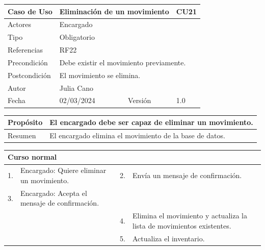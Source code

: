 \newpage


\begin{table}[H]
	\centering
	\begin{tabular}{| m{} | m{} | m{} | m{}|}
		\hline
		\rowcolor{grayshade} Caso de Uso & \multicolumn{2}{|m{0.43\textwidth}|}{Eliminación de un movimiento} &  CU21\\ 
		\hline
		Actores & \multicolumn{3}{l|}{Encargado} \\ 
		\hline
		Tipo & \multicolumn{3}{l|}{Obligatorio} \\ 
		\hline
		Referencias & \multicolumn{3}{l|}{RF22} \\ 
		\hline
		Precondición & \multicolumn{3}{m{0.67\textwidth}|}{Debe existir el movimiento previamente.} \\ 
		\hline
		Postcondición & \multicolumn{3}{m{0.67\textwidth}|}{El movimiento se elimina.} \\ 
		\hline
		Autor & \multicolumn{3}{l|}{Julia Cano} \\ 
		\hline
		Fecha & 02/03/2024 & Versión & 1.0 \\
		\hline
	\end{tabular}
\end{table}

\begin{table}[H]
	\centering
	\begin{tabular}{| m{} | m{} | m{} | m{} |}
		\hline
		Propósito & \multicolumn{3}{m{0.67\textwidth}|}{El encargado debe ser capaz de eliminar un movimiento.}  \\ 
		\hline
		Resumen & \multicolumn{3}{m{0.67\textwidth}|}{El encargado elimina el movimiento de la base de datos.} \\ 
		\hline
	\end{tabular}
\end{table}


\begin{table}[H]
	\centering
	\begin{tabular}{| m{} | m{} | m{} | m{} |}
		\hline
		\multicolumn{4}{|m{0.9\textwidth}|}{Curso normal}     \\ 
		\hline
		1. & Encargado: Quiere eliminar un movimiento. & 2. &  Envía un mensaje de confirmación.  \\ 
		\hline
		3. & Encargado: Acepta el mensaje de confirmación. &   &  \\ 
		\hline
		&  & 4. & Elimina el movimiento y actualiza la lista de movimientos existentes.  \\ 
		\hline
		&  & 5. & Actualiza el inventario.  \\ 
		\hline
	\end{tabular}
\end{table}

